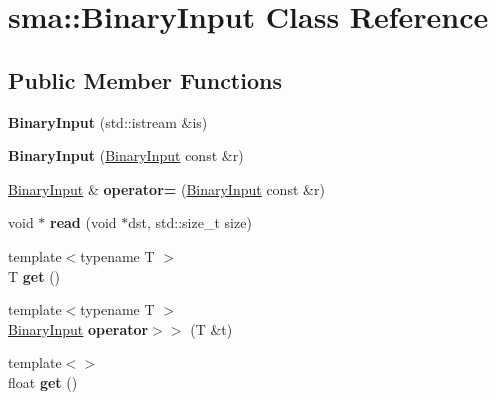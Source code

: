 \hypertarget{classsma_1_1BinaryInput}{\section{sma\-:\-:Binary\-Input Class Reference}
\label{classsma_1_1BinaryInput}
}
\subsection*{Public Member Functions}
\begin{DoxyCompactItemize}
\item 
\hypertarget{classsma_1_1BinaryInput_a03dae935b9d83e882da5e77ecfd8ebc9}{{\bfseries Binary\-Input} (std\-::istream \&is)}\label{classsma_1_1BinaryInput_a03dae935b9d83e882da5e77ecfd8ebc9}

\item 
\hypertarget{classsma_1_1BinaryInput_a1ccd9d0564d6e777544fee24bd7a99ab}{{\bfseries Binary\-Input} (\hyperlink{classsma_1_1BinaryInput}{Binary\-Input} const \&r)}\label{classsma_1_1BinaryInput_a1ccd9d0564d6e777544fee24bd7a99ab}

\item 
\hypertarget{classsma_1_1BinaryInput_a94e0016b49e429ec44b3e51f81d5a952}{\hyperlink{classsma_1_1BinaryInput}{Binary\-Input} \& {\bfseries operator=} (\hyperlink{classsma_1_1BinaryInput}{Binary\-Input} const \&r)}\label{classsma_1_1BinaryInput_a94e0016b49e429ec44b3e51f81d5a952}

\item 
\hypertarget{classsma_1_1BinaryInput_a33bb4e021d58a7e9615cdb8ebda5b4a2}{void $\ast$ {\bfseries read} (void $\ast$dst, std\-::size\-\_\-t size)}\label{classsma_1_1BinaryInput_a33bb4e021d58a7e9615cdb8ebda5b4a2}

\item 
\hypertarget{classsma_1_1BinaryInput_a605183bc9ff0506c287780a071319042}{{\footnotesize template$<$typename T $>$ }\\T {\bfseries get} ()}\label{classsma_1_1BinaryInput_a605183bc9ff0506c287780a071319042}

\item 
\hypertarget{classsma_1_1BinaryInput_a0c996cb47ed23163130c7ec2e55de5d1}{{\footnotesize template$<$typename T $>$ }\\\hyperlink{classsma_1_1BinaryInput}{Binary\-Input} {\bfseries operator$>$$>$} (T \&t)}\label{classsma_1_1BinaryInput_a0c996cb47ed23163130c7ec2e55de5d1}

\item 
\hypertarget{classsma_1_1BinaryInput_a573b369e69b08aebc193d85235645698}{{\footnotesize template$<$$>$ }\\float {\bfseries get} ()}\label{classsma_1_1BinaryInput_a573b369e69b08aebc193d85235645698}


\end{DoxyCompactItemize}
